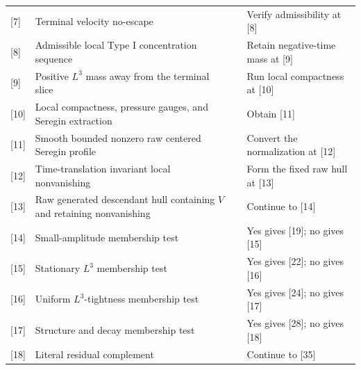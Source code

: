 \documentclass[11pt]{amsart}
\theoremstyle{plain}
\theoremstyle{definition}
\theoremstyle{remark}
\numberwithin{equation}{section}
\begin{document}
\begin{landscape}
\begin{longtable}{@{}C{0.72cm}L{4.55cm}L{7.25cm}L{6.05cm}@{}}
[7] & Terminal velocity no-escape &
 & Verify admissibility at [8] \\

[8] & Admissible local Type I concentration sequence &
 & Retain negative-time mass at [9] \\

[9] & Positive \(L^3\) mass away from the terminal slice &
 & Run local compactness at [10] \\

[10] & Local compactness, pressure gauges, and Seregin extraction &
 & Obtain [11] \\

[11] & Smooth bounded nonzero raw centered Seregin profile &
 & Convert the normalization at [12] \\

[12] & Time-translation invariant local nonvanishing &
 & Form the fixed raw hull at [13] \\

[13] & Raw generated descendant hull containing \(V\) and retaining nonvanishing &
 & Continue to [14] \\

[14] & Small-amplitude membership test &
 & Yes gives [19]; no gives [15] \\

[15] & Stationary \(L^3\) membership test &
 & Yes gives [22]; no gives [16] \\

[16] & Uniform \(L^3\)-tightness membership test &
 & Yes gives [24]; no gives [17] \\

[17] & Structure and decay membership test &
 & Yes gives [28]; no gives [18] \\

[18] & Literal residual complement &
 & Continue to [35] \\


\end{longtable}
\end{landscape}
\end{document}
